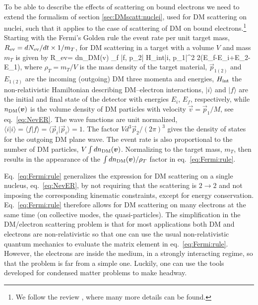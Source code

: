  To be able to describe the effects of scattering on bound electrons we need to extend the formalism of section \ref{sec:DMscatt:nuclei}, used for DM scattering on nuclei, such that it applies to the case of scattering of DM on bound electrons.\footnote{We follow the review \cite{dm:light:review}, where many more details can be found.} Starting with the Fermi's Golden rule the event rate per unit target mass, $R_{\rm ev}=dN_{\rm ev}/dt \times 1/m_T$, for DM scattering in a target with a volume $V$ and mass $m_T$ is given by \cite{SI:DM:electron:scattering,dm:light:review} 
 \beq
\label{eq:Fermi:rule}
R_{\rm ev}=  \int
dn_{\rm DM}(\vec v)   \sum_f \big|\langle f, \vec p_2\big| H_{\rm int}\big|i, \vec p_1\rangle \big|^2 2\pi \delta(E_f-E_i+E_2-E_1),
 \eeq
 where $\rho_T=m_T/V$ is the mass density of the target material, 
 $\vec p_{1(2)}$ and $E_{1(2)}$ are the incoming (outgoing) DM  three momenta and energies, $H_{\rm int}$  the non-relativistic Hamiltonian describing DM--electron interactions,  $|i\rangle$ and $|f\rangle$ are the initial and final state of the detector with energies $E_i$, $E_f$, respectively, while $n_{\rm DM}(\vec v)$ is the volume density of DM particles with velocity $\vec v=\vec p_1/M$, see eq.~\eqref{eq:NevER}. The wave functions are unit normalized, $\langle i|i\rangle=\langle f |f\rangle= \langle \vec p_i|\vec p_i\rangle=1$. The factor $Vd^3\vec p_2/(2\pi)^3$ gives the density of states for the outgoing DM plane wave. The event rate is also proportional to the number of DM particles, $V \int dn_{\rm DM}(\vec v)$. Normalizing to the target mass, $m_T$, then results in the appearance of the $\int dn_{\rm DM}(\vec v)/\rho_T$ factor in eq.~\eqref{eq:Fermi:rule}. 
 
Eq.~\eqref{eq:Fermi:rule} generalizes the expression for DM scattering on a single nucleus, eq.~\eqref{eq:NevER}, 
by not requiring that the scattering is $2\to 2$ and not imposing the corresponding kinematic constraints, 
except for energy conservation. 
Eq.~\eqref{eq:Fermi:rule} therefore allows for DM scattering on many electrons at the same time (on collective modes, the quasi-particles). 
The simplification in the DM/electron scattering problem is that for most applications both DM and electrons are non-relativistic so that one can use the usual non-relativistic quantum mechanics to evaluate the matrix element in eq.~\eqref{eq:Fermi:rule}. However, the electrons are inside the medium, in a strongly interacting regime, so that the problem is far from a simple one. 
Luckily, one can use the tools developed for condensed matter problems to make headway.
 
